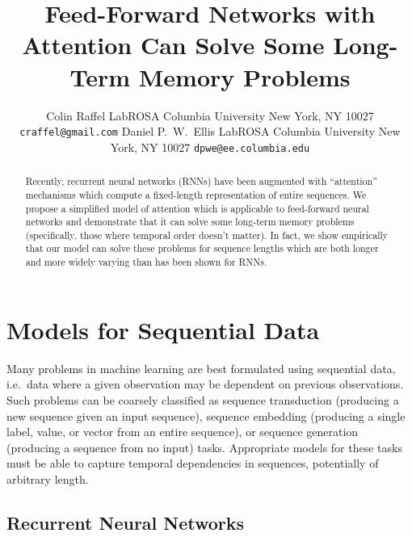 \documentclass{article} %
\title{Feed-Forward Networks with Attention Can Solve Some Long-Term Memory Problems}
\author{
Colin Raffel
LabROSA
Columbia University
New York, NY 10027
\texttt{craffel@gmail.com}
\And
Daniel P.~W.~Ellis
LabROSA
Columbia University
New York, NY 10027
\texttt{dpwe@ee.columbia.edu}
}
\begin{document}
\maketitle

\begin{abstract}
Recently, recurrent neural networks (RNNs) have been augmented with ``attention'' mechanisms which compute a fixed-length representation of entire sequences.
We propose a simplified model of attention which is applicable to feed-forward neural networks and demonstrate that it can solve some long-term memory problems (specifically, those where temporal order doesn't matter).
In fact, we show empirically that our model can solve these problems for sequence lengths which are both longer and more widely varying than has been shown for RNNs.
\end{abstract}

\section{Models for Sequential Data}

Many problems in machine learning are best formulated using sequential data, i.e.\ data where a given observation may be dependent on previous observations.
Such problems can be coarsely classified as sequence transduction (producing a new sequence given an input sequence), sequence embedding (producing a single label, value, or vector from an entire sequence), or sequence generation (producing a sequence from no input) tasks.
Appropriate models for these tasks must be able to capture temporal dependencies in sequences, potentially of arbitrary length.

\subsection{Recurrent Neural Networks}
\end{document}
